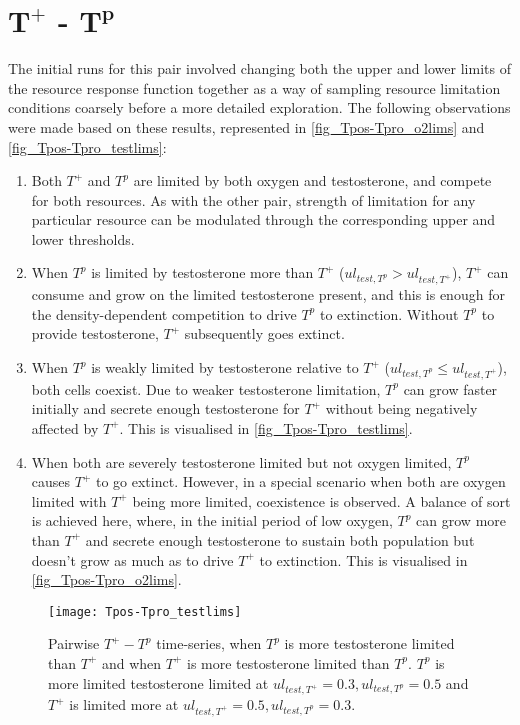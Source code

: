 \section{$\boldsymbol{T^+}$ - $\boldsymbol{T^p}$}
The initial runs for this pair involved changing both the upper and lower limits of the resource response function together as a way of sampling resource limitation conditions coarsely before a more detailed exploration. The following observations were made based on these results, represented in \autoref{fig_Tpos-Tpro_o2lims} and \autoref{fig_Tpos-Tpro_testlims}:
\begin{enumerate}
    \item Both $T^+$ and $T^p$ are limited by both oxygen and testosterone, and compete for both resources. As with the other pair, strength of limitation for any particular resource can be modulated through the corresponding upper and lower thresholds.
    \item When $T^p$ is limited by testosterone more than $T^+$ ($ul_{test,T^p} > ul_{test,T^+}$), $T^+$ can consume and grow on the limited testosterone present, and this is enough for the density-dependent competition to drive $T^p$ to extinction. Without $T^p$ to provide testosterone, $T^+$ subsequently goes extinct.
    \item When $T^p$ is weakly limited by testosterone relative to $T^+$ ($ul_{test,T^p} \leq ul_{test,T^+}$), both cells coexist. Due to weaker testosterone limitation, $T^p$ can grow faster initially and secrete enough testosterone for $T^+$ without being negatively affected by $T^+$. This is visualised in \autoref{fig_Tpos-Tpro_testlims}.
    \item When both are severely testosterone limited but not oxygen limited, $T^p$ causes $T^+$ to go extinct. However, in a special scenario when both are oxygen limited with $T^+$ being more limited, coexistence is observed. A balance of sort is achieved here, where, in the initial period of low oxygen, $T^p$ can grow more than $T^+$ and secrete enough testosterone to sustain both population but doesn’t grow as much as to drive $T^+$ to extinction. This is visualised in \autoref{fig_Tpos-Tpro_o2lims}.
  \end{enumerate}

\begin{figure}[h!]
  \centering
  \texttt{[image: Tpos-Tpro\_testlims]}
  \caption[Pairwise $T^+ - T^p$ time-series, testosterone limitation]{Pairwise $T^+ - T^p$ time-series, when $T^p$ is more testosterone limited than $T^+$ and when $T^+$ is more testosterone limited than $T^p$. $T^p$ is more limited testosterone limited at $ul_{test,T^+}=0.3,ul_{test,T^p}=0.5$ and $T^+$ is limited more at $ul_{test,T^+}=0.5,ul_{test,T^p}=0.3$.}
  \label{fig_Tpos-Tpro_testlims}
\end{figure}

